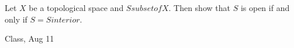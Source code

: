 \begin{samepage}
\begin{ex}
Let $X$ be a topological space and $S subset of X$. Then show that $S$ is open if and only if $S = S interior$.
\end{ex}
\begin{source}
Class, Aug 11
\end{source}
\end{samepage}
